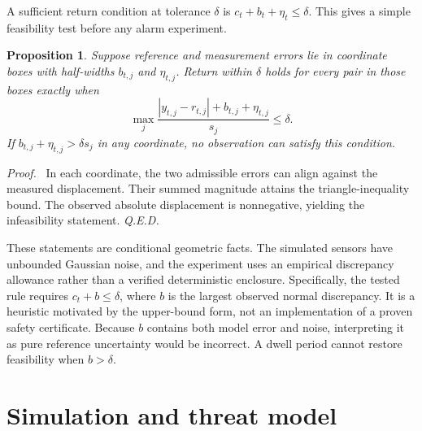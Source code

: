 \documentclass[11pt]{article}
\newtheorem{proposition}{Proposition}
\newenvironment{proof}{\par\noindent\textit{Proof.}\ }{\hfill\textit{Q.E.D.}\par}
\begin{document}
A sufficient return condition at tolerance $\delta$ is $c_t+b_t+\eta_t\le\delta$. This gives a simple feasibility test before any alarm experiment.
\begin{proposition}
Suppose reference and measurement errors lie in coordinate boxes with half-widths $b_{t,j}$ and $\eta_{t,j}$. Return within $\delta$ holds for every pair in those boxes exactly when
\begin{equation}
 \max_j\frac{|y_{t,j}-r_{t,j}|+b_{t,j}+\eta_{t,j}}{s_j}\le\delta.
 \label{eq:box}
\end{equation}
If $b_{t,j}+\eta_{t,j}>\delta s_j$ in any coordinate, no observation can satisfy this condition.
\end{proposition}
\begin{proof}
In each coordinate, the two admissible errors can align against the measured displacement. Their summed magnitude attains the triangle-inequality bound. The observed absolute displacement is nonnegative, yielding the infeasibility statement.
\end{proof}

These statements are conditional geometric facts. The simulated sensors have unbounded Gaussian noise, and the experiment uses an empirical discrepancy allowance rather than a verified deterministic enclosure. Specifically, the tested rule requires $c_t+b\le\delta$, where $b$ is the largest observed normal discrepancy. It is a heuristic motivated by the upper-bound form, not an implementation of a proven safety certificate. Because $b$ contains both model error and noise, interpreting it as pure reference uncertainty would be incorrect. A dwell period cannot restore feasibility when $b>\delta$.

\section{Simulation and threat model}
\end{document}
